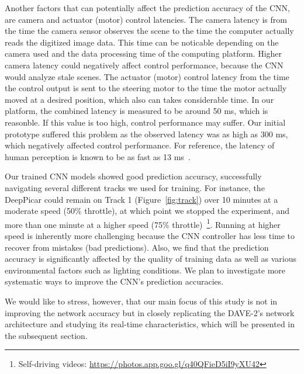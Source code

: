 Another factors that can potentially affect the prediction accuracy of
the CNN, are camera and actuator (motor) control latencies. The camera
latency is from the time the camera sensor observes the scene to the
time the computer actually reads the digitized image data. This time
can be noticable depending on the camera used and the data processing
time of the computing platform. Higher camera latency could
negatively affect control performance, because the CNN would analyze
stale scenes. The actuator (motor) control latency from the time
the control output is sent to the steering motor to the time the motor
actually moved at a desired position, which also can takes
considerable time. In our platform, the combined latency is measured
to be around 50 ms, which is reasonble.
If this value is too high, control performance may suffer.
Our initial prototype suffered this problem as the observed latency
was as high as 300 ms, which negatively affected control performance.
For reference, the latency of human perception is known to be as fast
as 13 ms~\cite{ThomasBurger2015}. 

Our trained CNN models showed good prediction accuracy, successfully
navigating several different tracks we used for training.
For instance, the DeepPicar could remain on Track 1
(Figure~\ref{fig:track}) over 10 minutes at a moderate speed (50\%
throttle), at which point we stopped the experiment, and more than one
minute at a higher speed (75\% throttle)~\footnote{Self-driving videos: \url{https://photos.app.goo.gl/q40QFieD5iI9yXU42}
}. Running at
higher speed is inherently more challenging because the CNN controller
has less time to recover from mistakes (bad predictions).  Also, we
find that the prediction accuracy is significantly affected by the
quality of training data as well as various environmental factors such
as lighting conditions. We plan to investigate more systematic ways
to improve the CNN's prediction accuracies.

We would like to stress, however, that
our main focus of this study is not in improving the network accuracy
but in closely replicating the DAVE-2's network architecture and
studying its real-time characteristics, which will be presented in the
subsequent section.
